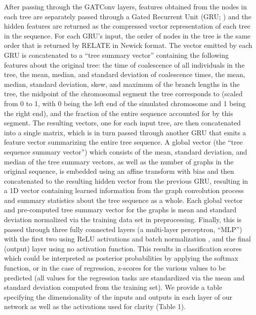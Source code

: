 After passing through the GATConv layers, features obtained from the nodes in each tree are separately passed through a Gated Recurrent Unit (GRU; \cite{choLearningPhraseRepresentations2014}) and the hidden features are returned as the compressed vector representation of each tree in the sequence. For each GRU’s input, the order of nodes in the tree is the same order that is returned by RELATE in Newick format.  The vector emitted by each GRU is concatenated to a “tree summary vector” containing the following features about the original tree: the time of coalescence of all individuals in the tree, the mean, median, and standard deviation of coalescence times, the mean, median, standard deviation, skew, and maximum of the branch lengths in the tree, the midpoint of the chromosomal segment the tree corresponds to (scaled from 0 to 1, with 0 being the left end of the simulated chromosome and 1 being the right end), and the fraction of the entire sequence accounted for by this segment. The resulting vectors, one for each input tree, are then concatenated into a single matrix, which is in turn passed through another GRU that emits a feature vector summarizing the entire tree sequence. A global vector (the “tree sequence summary vector”) which consists of the mean, standard deviation, and median of the tree summary vectors, as well as the number of graphs in the original sequence, is embedded using an affine transform with bias and then concatenated to the resulting hidden vector from the previous GRU, resulting in a 1D vector containing learned information from the graph convolution process and summary statistics about the tree sequence as a whole. Each global vector and pre-computed tree summary vector for the graphs is mean and standard deviation normalized via the training data set in preprocessing. Finally, this is passed through three fully connected layers (a multi-layer perceptron, “MLP”) with the first two using ReLU activations and batch normalization \cite{ioffeBatchNormalizationAccelerating2015}, and the final (output) layer using no activation function. This results in classification scores which could be interpreted as posterior probabilities by applying the softmax function, or in the case of regression, z-scores for the various values to be predicted (all   values for the regression tasks are standardized via the mean and standard deviation computed from the training set). We provide a table specifying the dimensionality of the inputs and outputs in each layer of our network as well as the activations used for clarity (Table 1).

